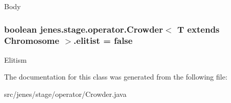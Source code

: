 Body \hypertarget{classjenes_1_1stage_1_1operator_1_1_crowder_3_01_t_01extends_01_chromosome_01_4_5337bdf3f7d5ad8d6e09daaa3bb0636b}{
\subsubsection[elitist]{\setlength{\rightskip}{0pt plus 5cm}boolean jenes.stage.operator.Crowder$<$ T extends Chromosome $>$.{\bf elitist} = false}}
\label{classjenes_1_1stage_1_1operator_1_1_crowder_3_01_t_01extends_01_chromosome_01_4_5337bdf3f7d5ad8d6e09daaa3bb0636b}


Elitism 

The documentation for this class was generated from the following file:\begin{CompactItemize}
\item 
src/jenes/stage/operator/Crowder.java\end{CompactItemize}
